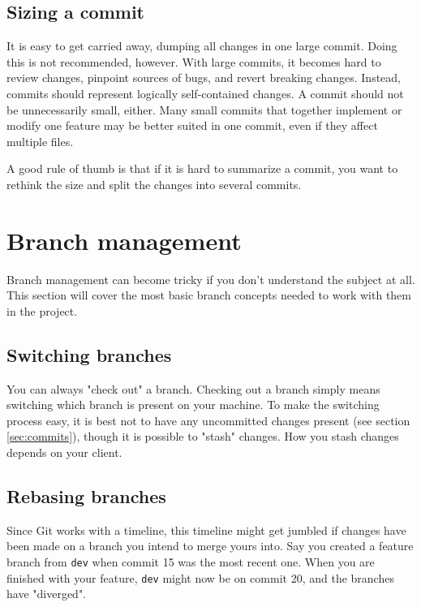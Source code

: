 \documentclass[12pt,a4paper]{article}
\begin{document}
    \subsection{Sizing a commit}
    \label{subsec:commit_sizes}
        It is easy to get carried away, dumping all changes in one large commit. Doing this is not recommended, however. With large commits, it becomes hard to review changes, pinpoint sources of bugs, and revert breaking changes. Instead, commits should represent logically self-contained changes. A commit should not be unnecessarily small, either. Many small commits that together implement or modify one feature may be better suited in one commit, even if they affect multiple files.
        
        A good rule of thumb is that if it is hard to summarize a commit, you want to rethink the size and split the changes into several commits.

\section{Branch management}
\label{sec:branch_management}
    Branch management can become tricky if you don't understand the subject at all. This section will cover the most basic branch concepts needed to work with them in the project.

    \subsection{Switching branches}
    \label{subsec:branch_switch}
        You can always "check out" a branch. Checking out a branch simply means switching which branch is present on your machine. To make the switching process easy, it is best not to have any uncommitted changes present (see section \ref{sec:commits}), though it is possible to "stash" changes. How you stash changes depends on your client.

    \subsection{Rebasing branches}
    \label{subsec:branch_rebase}
        Since Git works with a timeline, this timeline might get jumbled if changes have been made on a branch you intend to merge yours into. Say you created a feature branch from \verb|dev| when commit 15 was the most recent one. When you are finished with your feature, \verb|dev| might now be on commit 20, and the branches have "diverged".
\end{document}
